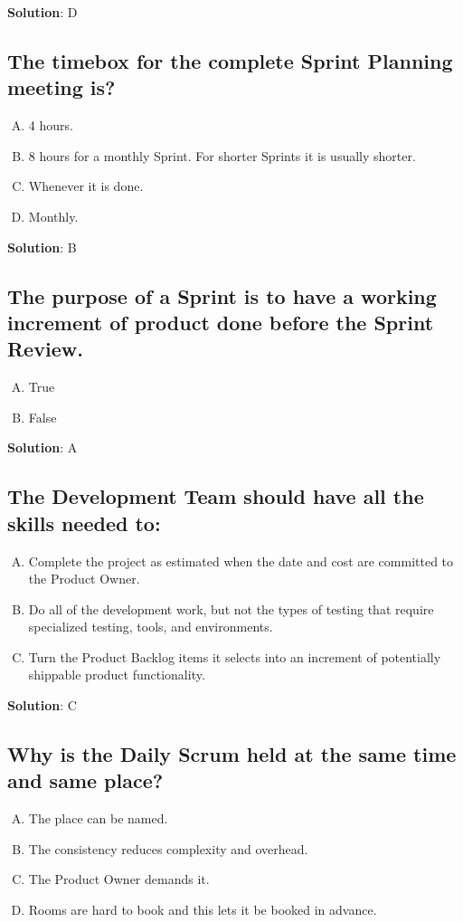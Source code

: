 \textbf{Solution}: D


\subsection{The timebox for the complete Sprint Planning meeting is?}
\begin{enumerate}[A)]
  \item 4 hours.
  \item 8 hours for a monthly Sprint. For shorter Sprints it is usually shorter.
  \item Whenever it is done.
  \item Monthly.
\end{enumerate}


\textbf{Solution}: B


\subsection{The purpose of a Sprint is to have a working increment of product done before the Sprint Review.}
\begin{enumerate}[A)]
  \item True
  \item False
\end{enumerate}


\textbf{Solution}: A


\subsection{The Development Team should have all the skills needed to:}
\begin{enumerate}[A)]
  \item Complete the project as estimated when the date and cost are committed to the Product Owner.
  \item Do all of the development work, but not the types of testing that require specialized testing, tools, and environments.
  \item Turn the Product Backlog items it selects into an increment of potentially shippable product functionality.
\end{enumerate}


\textbf{Solution}: C


\subsection{Why is the Daily Scrum held at the same time and same place?}
\begin{enumerate}[A)]
  \item The place can be named.
  \item The consistency reduces complexity and overhead.
  \item The Product Owner demands it.
  \item Rooms are hard to book and this lets it be booked in advance.
\end{enumerate}


